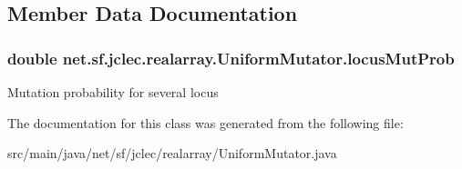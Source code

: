 \subsection{Member Data Documentation}
\hypertarget{classnet_1_1sf_1_1jclec_1_1realarray_1_1_uniform_mutator_ab5a0d929acb803f2aea077438a92a231}{
\subsubsection[{locus\-Mut\-Prob}]{\setlength{\rightskip}{0pt plus 5cm}double net.\-sf.\-jclec.\-realarray.\-Uniform\-Mutator.\-locus\-Mut\-Prob\hspace{0.3cm}{\ttfamily [protected]}}}\label{classnet_1_1sf_1_1jclec_1_1realarray_1_1_uniform_mutator_ab5a0d929acb803f2aea077438a92a231}
Mutation probability for several locus 

The documentation for this class was generated from the following file\-:\begin{DoxyCompactItemize}
\item 
src/main/java/net/sf/jclec/realarray/Uniform\-Mutator.\-java\end{DoxyCompactItemize}
